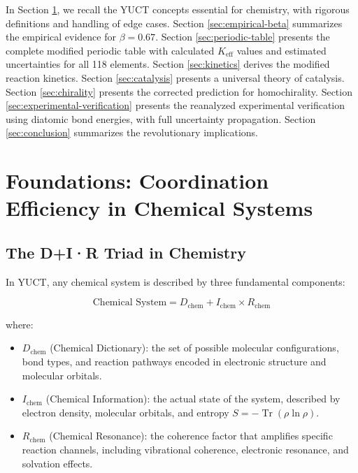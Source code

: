 \documentclass[12pt,a4paper]{article}
\theoremstyle{remark}
\newcommand{\Keff}{K_{\mathrm{eff}}}
\DeclareMathOperator{\Tr}{Tr}
\begin{document}
	In Section \ref{sec:foundations}, we recall the YUCT concepts essential for chemistry, with rigorous definitions and handling of edge cases. Section \ref{sec:empirical-beta} summarizes the empirical evidence for $\beta = 0.67$. Section \ref{sec:periodic-table} presents the complete modified periodic table with calculated $\Keff$ values and estimated uncertainties for all 118 elements. Section \ref{sec:kinetics} derives the modified reaction kinetics. Section \ref{sec:catalysis} presents a universal theory of catalysis. Section \ref{sec:chirality} presents the corrected prediction for homochirality. Section \ref{sec:experimental-verification} presents the reanalyzed experimental verification using diatomic bond energies, with full uncertainty propagation. Section \ref{sec:conclusion} summarizes the revolutionary implications.
	
	\section{Foundations: Coordination Efficiency in Chemical Systems}
	\label{sec:foundations}
	
	\subsection{The D+I·R Triad in Chemistry}
	
	In YUCT, any chemical system is described by three fundamental components:
	
	\begin{equation}
		\text{Chemical System} = D_{\text{chem}} + I_{\text{chem}} \times R_{\text{chem}}
		\label{eq:chem-triad}
	\end{equation}
	
	where:
	\begin{itemize}
		\item $D_{\text{chem}}$ (Chemical Dictionary): the set of possible molecular configurations, bond types, and reaction pathways encoded in electronic structure and molecular orbitals.
		\item $I_{\text{chem}}$ (Chemical Information): the actual state of the system, described by electron density, molecular orbitals, and entropy $S = -\Tr(\rho \ln \rho)$.
		\item $R_{\text{chem}}$ (Chemical Resonance): the coherence factor that amplifies specific reaction channels, including vibrational coherence, electronic resonance, and solvation effects.
	\end{itemize}
	
\end{document}
